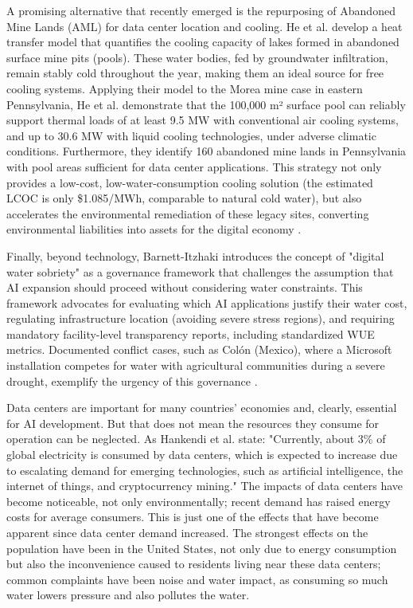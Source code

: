 \documentclass[conference]{IEEEtran}
\begin{document}
A promising alternative that recently emerged is the repurposing of Abandoned Mine Lands (AML) for data center location and cooling. He et al. \cite{He2026} develop a heat transfer model that quantifies the cooling capacity of lakes formed in abandoned surface mine pits (pools). These water bodies, fed by groundwater infiltration, remain stably cold throughout the year, making them an ideal source for free cooling systems. Applying their model to the Morea mine case in eastern Pennsylvania, He et al. \cite{He2026} demonstrate that the 100,000 m² surface pool can reliably support thermal loads of at least 9.5 MW with conventional air cooling systems, and up to 30.6 MW with liquid cooling technologies, under adverse climatic conditions. Furthermore, they identify 160 abandoned mine lands in Pennsylvania with pool areas sufficient for data center applications. This strategy not only provides a low-cost, low-water-consumption cooling solution (the estimated LCOC is only \$1.085/MWh, comparable to natural cold water), but also accelerates the environmental remediation of these legacy sites, converting environmental liabilities into assets for the digital economy \cite{He2026}.

Finally, beyond technology, Barnett-Itzhaki \cite{Barnett2026} introduces the concept of "digital water sobriety" as a governance framework that challenges the assumption that AI expansion should proceed without considering water constraints. This framework advocates for evaluating which AI applications justify their water cost, regulating infrastructure location (avoiding severe stress regions), and requiring mandatory facility-level transparency reports, including standardized WUE metrics. Documented conflict cases, such as Colón (Mexico), where a Microsoft installation competes for water with agricultural communities during a severe drought, exemplify the urgency of this governance \cite{Barnett2026}.

Data centers are important for many countries' economies and, clearly, essential for AI development. But that does not mean the resources they consume for operation can be neglected. As Hankendi et al. \cite{Hankendi2026} state: "Currently, about 3\% of global electricity is consumed by data centers, which is expected to increase due to escalating demand for emerging technologies, such as artificial intelligence, the internet of things, and cryptocurrency mining." The impacts of data centers have become noticeable, not only environmentally; recent demand has raised energy costs for average consumers. This is just one of the effects that have become apparent since data center demand increased. The strongest effects on the population have been in the United States, not only due to energy consumption but also the inconvenience caused to residents living near these data centers; common complaints have been noise and water impact, as consuming so much water lowers pressure and also pollutes the water.
\end{document}
